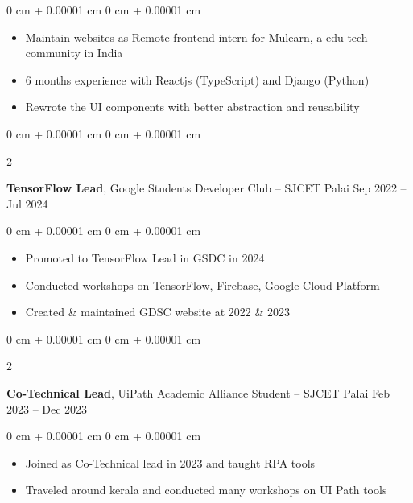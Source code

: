 \documentclass[10pt, letterpaper]{article}
\newenvironment{highlights}{
    \begin{itemize}[
        topsep=0.10 cm,
        parsep=0.10 cm,
        partopsep=0pt,
        itemsep=0pt,
        leftmargin=0 cm + 10pt
    ]
}{
    \end{itemize}
} %
\newenvironment{onecolentry}{
    \begin{adjustwidth}{
        0 cm + 0.00001 cm
    }{
        0 cm + 0.00001 cm
    }
}{
    \end{adjustwidth}
} %
\newenvironment{twocolentry}[2][]{
    \onecolentry
    \def\secondColumn{#2}
    \setcolumnwidth{\fill, 4.5 cm}
    \begin{paracol}{2}
}{
    \switchcolumn \raggedleft \secondColumn
    \end{paracol}
    \endonecolentry
} %
\begin{document}
\vspace{0.10 cm}
\begin{onecolentry}
    \begin{highlights}
        \item Maintain websites as Remote frontend intern for Mulearn, a edu-tech community
        in India
        \item 6 months experience with Reactjs (TypeScript) and Django (Python)
        \item Rewrote the UI components with better abstraction and reusability
    \end{highlights}
\end{onecolentry}

\vspace{0.2 cm}

\begin{twocolentry}{
        Sep 2022 – Jul 2024
    }
    \textbf{TensorFlow Lead}, Google Students Developer Club -- SJCET Palai\end{twocolentry}

\vspace{0.10 cm}
\begin{onecolentry}
    \begin{highlights}
        \item Promoted to TensorFlow Lead in GSDC in 2024
        \item Conducted workshops on TensorFlow, Firebase, Google Cloud Platform
        \item Created \& maintained GDSC website at 2022 \& 2023
    \end{highlights}
\end{onecolentry}

\vspace{0.2 cm}

\begin{twocolentry}{
        Feb 2023 – Dec 2023
    }
    \textbf{Co-Technical Lead}, UiPath Academic Alliance Student -- SJCET Palai\end{twocolentry}

\vspace{0.10 cm}
\begin{onecolentry}
    \begin{highlights}
        \item Joined as Co-Technical lead in 2023 and taught RPA tools
        \item Traveled around kerala and conducted many workshops on UI Path tools
    \end{highlights}
\end{onecolentry}
\end{document}
